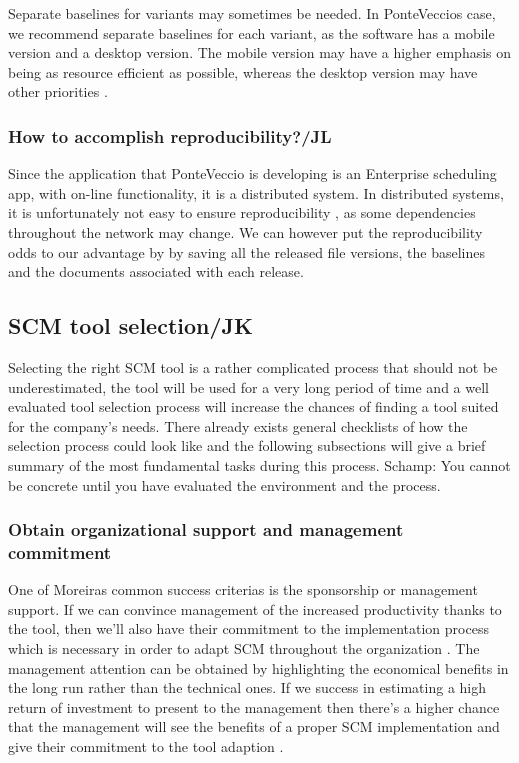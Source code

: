 \documentclass[10pt]{article}
\begin{document}
\noindent Separate baselines for variants may sometimes be needed. In PonteVeccios case, we recommend separate baselines for each variant, as the software has a mobile version and a desktop version. The mobile version may have a higher emphasis on being as resource efficient as possible, whereas the desktop version may have other priorities \cite{Nielsen}.

\subsubsection{How to accomplish reproducibility?/JL}
\noindent Since the application that PonteVeccio is developing is an Enterprise scheduling app, with on-line functionality, it is a distributed system. In distributed systems, it is unfortunately not easy to ensure reproducibility \cite{Bays}, as some dependencies throughout the network may change. We can however put the reproducibility odds to our advantage by by saving all the released file versions, the baselines and the documents associated with each release. 

\subsection{SCM tool selection/JK}
Selecting the right SCM tool is a rather complicated process that should not be underestimated, the tool will be used for a very long period of time and a well evaluated tool selection process will increase the chances of finding a tool suited for the company's needs. There already exists general checklists of how the selection process could look like and the following subsections will give a brief summary of the most fundamental tasks during this process.
Schamp: You cannot be concrete until you have evaluated the environment and the process.

\subsubsection{Obtain organizational support and management commitment}
One of Moreiras \cite{Moreira} common success criterias is the sponsorship or management support. If we can convince management of the increased productivity thanks to the tool, then we'll also have their commitment to the implementation process which is necessary in order to adapt SCM throughout the organization \cite{Sayko}. The management attention can be obtained by highlighting the economical benefits in the long run rather than the technical ones. If we success in estimating a high return of investment to present to the management then there's a higher chance that the management will see the benefits of a proper SCM implementation and give their commitment to the tool adaption \cite{Sayko}. 
\end{document}
